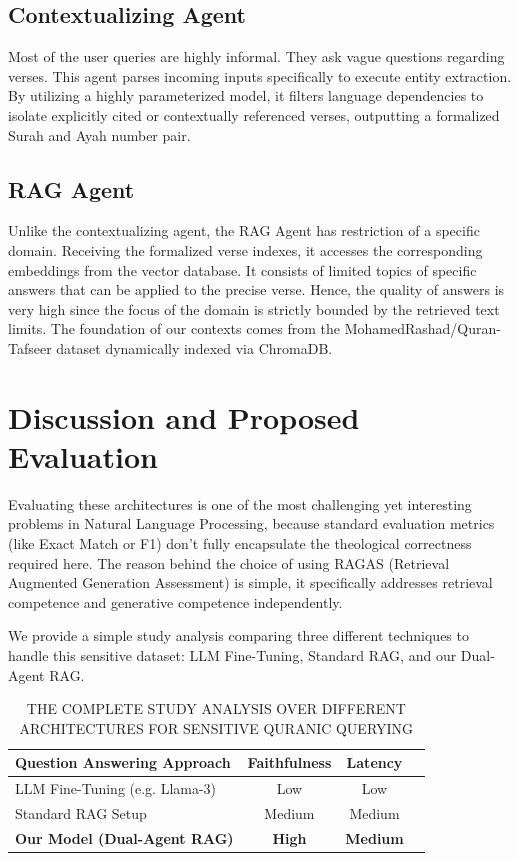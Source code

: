\documentclass[conference]{IEEEtran}
\begin{document}
\subsection{Contextualizing Agent}
Most of the user queries are highly informal. They ask vague questions regarding verses. This agent parses incoming inputs specifically to execute entity extraction. By utilizing a highly parameterized model, it filters language dependencies to isolate explicitly cited or contextually referenced verses, outputting a formalized Surah and Ayah number pair.

\subsection{RAG Agent}
Unlike the contextualizing agent, the RAG Agent has restriction of a specific domain. Receiving the formalized verse indexes, it accesses the corresponding embeddings from the vector database. It consists of limited topics of specific answers that can be applied to the precise verse. Hence, the quality of answers is very high since the focus of the domain is strictly bounded by the retrieved text limits. The foundation of our contexts comes from the MohamedRashad/Quran-Tafseer dataset dynamically indexed via ChromaDB.

\section{Discussion and Proposed Evaluation}
Evaluating these architectures is one of the most challenging yet interesting problems in Natural Language Processing, because standard evaluation metrics (like Exact Match or F1) don't fully encapsulate the theological correctness required here. The reason behind the choice of using RAGAS (Retrieval Augmented Generation Assessment) is simple, it specifically addresses retrieval competence and generative competence independently.

We provide a simple study analysis comparing three different techniques to handle this sensitive dataset: LLM Fine-Tuning, Standard RAG, and our Dual-Agent RAG.

\begin{table}[ht] 
\centering
\caption{THE COMPLETE STUDY ANALYSIS OVER DIFFERENT ARCHITECTURES FOR SENSITIVE QURANIC QUERYING} %
\centering      %
\begin{tabular}{l c c c}  %
\hline\hline                        %
Question Answering Approach & Faithfulness & Latency \\   
\hline                
LLM Fine-Tuning (e.g. Llama-3) & Low & Low \\
Standard RAG Setup & Medium & Medium\\
\textbf{Our Model (Dual-Agent RAG)} & \textbf{High} &\textbf{Medium}\\
\hline    
\end{tabular} 
\end{table}
\end{document}
